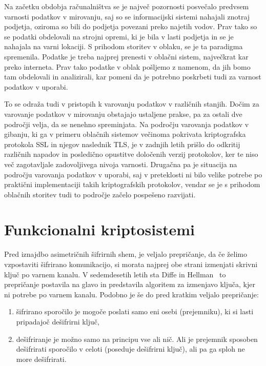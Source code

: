\documentclass[12pt,a4paper,openany,tikz]{book}
\theoremstyle{plain}
\theoremstyle{definition}
\begin{document}
Na začetku obdobja računalništva se je največ pozornosti posvečalo predvsem varnosti podatkov v mirovanju, saj so se informacijski sistemi nahajali znotraj podjetja, oziroma so bili do podjetja povezani preko najetih vodov. Prav tako so se podatki obdelovali na strojni opremi, ki je bila v lasti podjetja in se je nahajala na varni lokaciji. S prihodom storitev v oblaku, se je ta paradigma spremenila. Podatke je treba najprej prenesti v oblačni sistem, največkrat kar preko interneta. Prav tako podatke v oblak pošljemo z namenom, da jih bomo tam obdelovali in analizirali, kar pomeni da je potrebno poskrbeti tudi za varnost podatkov v uporabi.

To se odraža tudi v pristopih k varovanju podatkov v različnih stanjih. Dočim za varovanje podatkov v mirovanju obstajajo ustaljene prakse, pa za ostali dve področji velja, da se nenehno spreminjata. Na področju varovanja podatkov v gibanju, ki ga v primeru oblačnih sistemov večinoma pokrivata kriptografska protokola \acrfull{SSL} in njegov naslednik \acrfull{TLS}, je v zadnjih letih prišlo do odkritij različnih napadov in posledično opustitve določenih verzij protokolov, ker te niso več zagotavljale zadovoljivega nivoja varnosti. Drugačna pa je situacija na področju varovanja podatkov v uporabi, saj v preteklosti ni bilo velike potrebe po praktični implementaciji takih kriptografskih protokolov, vendar se je s prihodom oblačnih storitev tudi to področje začelo pospešeno razvijati.

\section{Funkcionalni kriptosistemi}
\label{sec:Funkcionalni kriptosistemi}

Pred iznajdbo asimetričnih šifrirnih shem, je veljalo prepričanje, da če želimo vzpostaviti šifrirano komunikacijo, si morata najprej obe strani izmenjati skrivni ključ po varnem kanalu. V sedemdesetih letih sta Diffe in Hellman~\cite{diffie1976new} to prepričanje postavila na glavo in predstavila algoritem za izmenjavo ključa, kjer ni potrebe po varnem kanalu.
Podobno je še do pred kratkim veljalo prepričanje:
\begin{enumerate}
  \item šifrirano sporočilo je mogoče poslati samo eni osebi (prejemniku), ki si lasti pripadajoč dešifrirni ključ,
  \item dešifriranje je možno samo na principu vse ali nič. Ali je prejemnik sposoben dešifrirati sporočilo v celoti (poseduje dešifrirni ključ), ali pa ga sploh ne more dešifrirati.
\end{enumerate}
\end{document}
